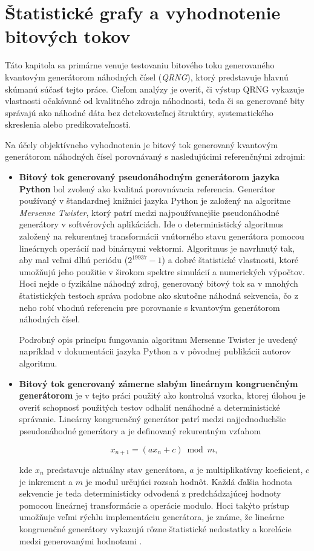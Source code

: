 \chapter{Štatistické grafy a vyhodnotenie bitových tokov}

Táto kapitola sa primárne venuje testovaniu bitového toku generovaného kvantovým generátorom náhodných čísel (\textit{QRNG}), ktorý predstavuje hlavnú skúmanú súčasť tejto práce.
Cieľom analýzy je overiť, či výstup QRNG vykazuje vlastnosti očakávané od kvalitného zdroja náhodnosti, teda či sa generované bity správajú ako náhodné dáta bez detekovateľnej štruktúry, systematického skreslenia alebo predikovateľnosti.

Na účely objektívneho vyhodnotenia je bitový tok generovaný kvantovým generátorom náhodných čísel porovnávaný s nasledujúcimi referenčnými zdrojmi:
\begin{itemize}
  \item \textbf{Bitový tok generovaný pseudonáhodným generátorom jazyka Python} bol zvolený ako kvalitná porovnávacia referencia.
  Generátor používaný v štandardnej knižnici jazyka Python je založený na algoritme \textit{Mersenne Twister}, ktorý patrí medzi najpoužívanejšie pseudonáhodné generátory v softvérových aplikáciách.
  Ide o deterministický algoritmus založený na rekurentnej transformácii vnútorného stavu generátora pomocou lineárnych operácií nad binárnymi vektormi.
  Algoritmus je navrhnutý tak, aby mal veľmi dlhú periódu ($2^{19937}-1$) a dobré štatistické vlastnosti, ktoré umožňujú jeho použitie v širokom spektre simulácií a numerických výpočtov.
  Hoci nejde o fyzikálne náhodný zdroj, generovaný bitový tok sa v mnohých štatistických testoch správa podobne ako skutočne náhodná sekvencia, čo z neho robí vhodnú referenciu pre porovnanie s kvantovým generátorom náhodných čísel.

  Podrobný opis princípu fungovania algoritmu Mersenne Twister je uvedený napríklad v dokumentácii jazyka Python\cite{python_random_docs} a v pôvodnej publikácii autorov algoritmu\cite{matsumoto1998mersenne}.

  \item \textbf{Bitový tok generovaný zámerne slabým lineárnym kongruenčným generátorom} je v tejto práci použitý ako kontrolná vzorka, ktorej úlohou je overiť schopnosť použitých testov odhaliť nenáhodné a deterministické správanie.
  Lineárny kongruenčný generátor patrí medzi najjednoduchšie pseudonáhodné generátory a je definovaný rekurentným vzťahom

  \[
    x_{n+1} = (a x_n + c) \bmod m,
  \]

  kde $x_n$ predstavuje aktuálny stav generátora, $a$ je multiplikatívny koeficient, $c$ je inkrement a $m$ je modul určujúci rozsah hodnôt.
  Každá ďalšia hodnota sekvencie je teda deterministicky odvodená z predchádzajúcej hodnoty pomocou lineárnej transformácie a operácie modulo.
  Hoci takýto prístup umožňuje veľmi rýchlu implementáciu generátora, je známe, že lineárne kongruenčné generátory vykazujú rôzne štatistické nedostatky a korelácie medzi generovanými hodnotami \cite{knuth1997art}.
  \end{itemize}

